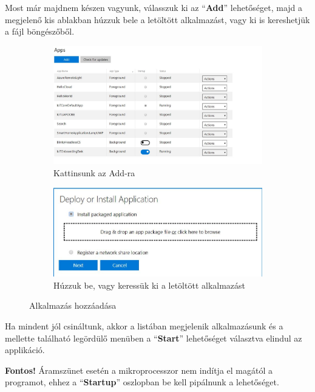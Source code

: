 \documentclass[a4paper,12pt]{report}
\begin{document}
    Most már majdnem készen vagyunk, válasszuk ki az ``\textbf{Add}'' lehetőséget, majd a megjelenő kis ablakban húzzuk bele
    a letöltött alkalmazást, vagy ki is kereshetjük a fájl böngészőből.

\begin{figure}[H]
    \centering
    \begin{subfigure}[b]{0.4\linewidth}
        \includegraphics[width=\linewidth]{images/addapps.jpg}
        \caption{Kattinsunk az Add-ra}
    \end{subfigure}
    \begin{subfigure}[b]{0.4\linewidth}
        \includegraphics[width=\linewidth]{images/deploy.jpg}
        \caption{Húzzuk be, vagy keressük ki a letöltött alkalmazást}
    \end{subfigure}
    \caption{Alkalmazás hozzáadása}
    \label{fig:AddApps}
\end{figure}

    Ha mindent jól csináltunk, akkor a listában megjelenik alkalmazásunk és a mellette található legördülő menüben a ``\textbf{Start}''
    lehetőséget választva elindul az applikáció.

    \textbf{Fontos!} Áramszünet esetén a mikroprocesszor nem indítja el magától a programot, ehhez a ``\textbf{Startup}'' oszlopban
    be kell pipálnunk a lehetőséget.
\end{document}
